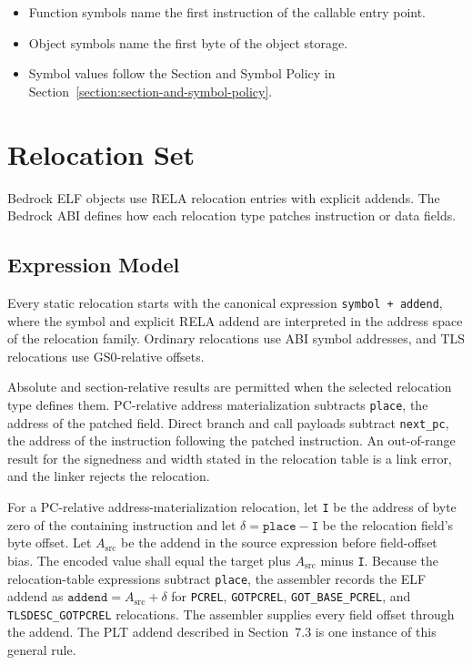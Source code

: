 \documentclass[10pt,twoside]{article}
\begin{document}
\begin{itemize}
\item Function symbols name the first instruction of the callable entry point.
\item Object symbols name the first byte of the object storage.
\item Symbol values follow the Section and Symbol Policy in
Section~\ref{section:section-and-symbol-policy}.
\end{itemize}
\clearpage
\section{Relocation Set}\label{page:relocation-set}
Bedrock ELF objects use RELA relocation entries with explicit addends. The Bedrock ABI defines how each relocation type patches instruction or data fields.
\subsection{Expression Model}
Every static relocation starts with the canonical expression
\texttt{symbol + addend},
where the symbol and explicit RELA addend are interpreted in the address space
of the relocation family. Ordinary relocations use ABI symbol addresses, and
TLS relocations use GS0-relative offsets.

Absolute and section-relative results are permitted when the selected
relocation type defines them. PC-relative address materialization subtracts
\texttt{place}, the address of the patched field. Direct branch and call payloads
subtract \texttt{next\_pc}, the address of the instruction following the patched
instruction. An out-of-range result for the signedness and width stated in the
relocation table is a link error, and the linker rejects the relocation.

For a PC-relative address-materialization relocation, let \texttt{I} be the
address of byte zero of the containing instruction and let
$\delta=\texttt{place}-\texttt{I}$ be the relocation field's byte offset. Let
$A_{\mathrm{src}}$ be the addend in the source expression before field-offset
bias. The encoded value shall equal the target plus $A_{\mathrm{src}}$ minus
\texttt{I}. Because the relocation-table expressions subtract \texttt{place}, the
assembler records the ELF addend as
$\texttt{addend}=A_{\mathrm{src}}+\delta$ for
\texttt{PCREL}, \texttt{GOTPCREL}, \texttt{GOT\_BASE\_PCREL}, and
\texttt{TLSDESC\_GOTPCREL} relocations. The assembler supplies every field
offset through the addend. The PLT addend described in Section~7.3 is one instance of this
general rule.
\end{document}
